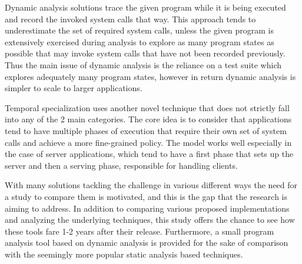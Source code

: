 Dynamic analysis solutions \cite{ref_dyn_1} trace the given program while it is being executed and record the invoked system calls that way. This approach tends to underestimate the set of required system calls, unless the given program is extensively exercised during analysis to explore as many program states as possible that may invoke system calls that have not been recorded previously. Thus the main issue of dynamic analysis is the reliance on a test suite which explores adequately many program states, however in return dynamic analysis is simpler to scale to larger applications.

Temporal specialization \cite{ref_mp_1} uses another novel technique that does not strictly fall into any of the 2 main categories. The core idea is to consider that applications tend to have multiple phases of execution that require their own set of system calls and achieve a more fine-grained policy. The model works well especially in the case of server applications, which tend to have a first phase that sets up the server and then a serving phase, responsible for handling clients.

With many solutions tackling the challenge in various different ways the need for a study to compare them is motivated, and this is the gap that the research is aiming to address. In addition to comparing various proposed implementations and analyzing the underlying techniques, this study offers the chance to see how these tools fare 1-2 years after their release. Furthermore, a small program analysis tool based on dynamic analysis is provided for the sake of comparison with the seemingly more popular static analysis based techniques.
